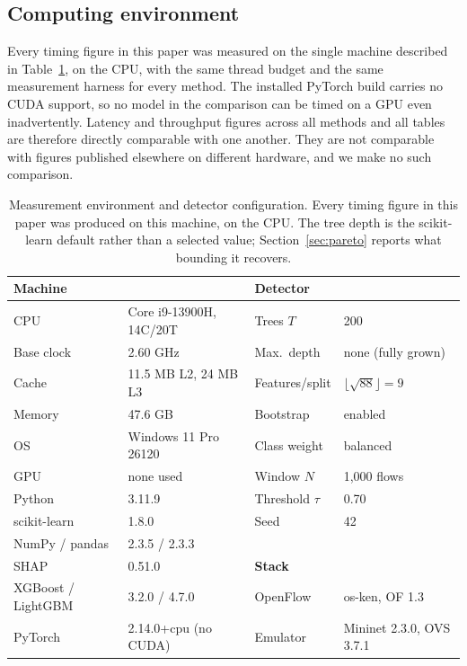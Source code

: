 \documentclass{ieeeaccess}
\begin{document}
\subsection{Computing environment}
\label{sec:environment}
Every timing figure in this paper was measured on the single machine described in Table~\ref{tab:environment}, on the CPU, with the same thread budget and the same measurement harness for every method. The installed PyTorch build carries no CUDA support, so no model in the comparison can be timed on a GPU even inadvertently. Latency and throughput figures across all methods and all tables are therefore directly comparable with one another. They are not comparable with figures published elsewhere on different hardware, and we make no such comparison.

\begin{table}[!t]
\caption{Measurement environment and detector configuration. Every timing figure
in this paper was produced on this machine, on the CPU. The tree depth is the scikit-learn default rather than a selected value;
Section~\ref{sec:pareto} reports what bounding it recovers.}
\centering
\label{tab:environment}
\footnotesize
\setlength{\tabcolsep}{3pt}
\renewcommand{\arraystretch}{1.1}
\begin{tabular}{@{}llll@{}}
\toprule
\textbf{Machine} & & \textbf{Detector} & \\
\midrule
CPU & Core i9-13900H, 14C/20T & Trees $T$ & 200 \\
Base clock & 2.60 GHz & Max.\ depth & none (fully grown) \\
Cache & 11.5 MB L2, 24 MB L3 & Features/split & $\lfloor\sqrt{88}\rfloor=9$ \\
Memory & 47.6 GB & Bootstrap & enabled \\
OS & Windows 11 Pro 26120 & Class weight & balanced \\
GPU & none used & Window $N$ & 1,000 flows \\
Python & 3.11.9 & Threshold $\tau$ & 0.70 \\
scikit-learn & 1.8.0 & Seed & 42 \\
NumPy / pandas & 2.3.5 / 2.3.3 & & \\
SHAP & 0.51.0 & \textbf{Stack} & \\
XGBoost / LightGBM & 3.2.0 / 4.7.0 & OpenFlow & os-ken, OF 1.3 \\
PyTorch & 2.14.0+cpu (no CUDA) & Emulator & Mininet 2.3.0, OVS 3.7.1 \\
\bottomrule
\end{tabular}
\end{table}
\end{document}
